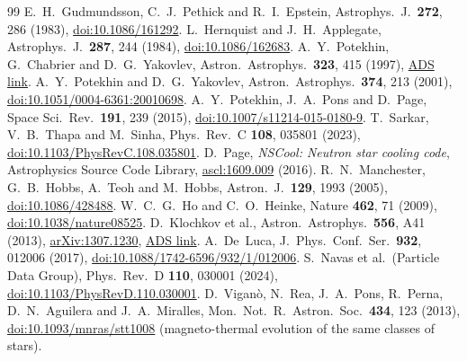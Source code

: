 \documentclass[11pt,a4paper]{article}
\newcommand{\doi}[1]{\href{https://doi.org/#1}{doi:#1}}
\newcommand{\arxiv}[1]{\href{https://arxiv.org/abs/#1}{arXiv:#1}}
\newcommand{\ads}[1]{\href{https://ui.adsabs.harvard.edu/abs/#1}{ADS link}}
\begin{document}
\begin{thebibliography}{99}
\small
{} E.~H.~Gudmundsson, C.~J.~Pethick and R.~I.~Epstein, Astrophys.\ J.\ \textbf{272}, 286 (1983), \doi{10.1086/161292}.
 L.~Hernquist and J.~H.~Applegate, Astrophys.\ J.\ \textbf{287}, 244 (1984), \doi{10.1086/162683}.
 A.~Y.~Potekhin, G.~Chabrier and D.~G.~Yakovlev, Astron.\ Astrophys.\ \textbf{323}, 415 (1997), \ads{1997A\%26A...323..415P}.
 A.~Y.~Potekhin and D.~G.~Yakovlev, Astron.\ Astrophys.\ \textbf{374}, 213 (2001), \doi{10.1051/0004-6361:20010698}.
 A.~Y.~Potekhin, J.~A.~Pons and D.~Page, Space Sci.\ Rev.\ \textbf{191}, 239 (2015), \doi{10.1007/s11214-015-0180-9}.
 T.~Sarkar, V.~B.~Thapa and M.~Sinha, Phys.\ Rev.\ C \textbf{108}, 035801 (2023), \doi{10.1103/PhysRevC.108.035801}.
 D.~Page, \emph{NSCool: Neutron star cooling code}, Astrophysics Source Code Library, \href{https://ascl.net/1609.009}{ascl:1609.009} (2016).
 R.~N.~Manchester, G.~B.~Hobbs, A.~Teoh and M.~Hobbs, Astron.\ J.\ \textbf{129}, 1993 (2005), \doi{10.1086/428488}.
 W.~C.~G.~Ho and C.~O.~Heinke, Nature \textbf{462}, 71 (2009), \doi{10.1038/nature08525}.
 D.~Klochkov et al., Astron.\ Astrophys.\ \textbf{556}, A41 (2013), \arxiv{1307.1230}, \ads{2013A\%26A...556A..41K}.
 A.~De~Luca, J.\ Phys.\ Conf.\ Ser.\ \textbf{932}, 012006 (2017), \doi{10.1088/1742-6596/932/1/012006}.
 S.~Navas et al.\ (Particle Data Group), Phys.\ Rev.\ D \textbf{110}, 030001 (2024), \doi{10.1103/PhysRevD.110.030001}.
 D.~Vigan\`o, N.~Rea, J.~A.~Pons, R.~Perna, D.~N.~Aguilera and J.~A.~Miralles, Mon.\ Not.\ R.\ Astron.\ Soc.\ \textbf{434}, 123 (2013), \doi{10.1093/mnras/stt1008} (magneto-thermal evolution of the same classes of stars).
\end{thebibliography}
\end{document}
